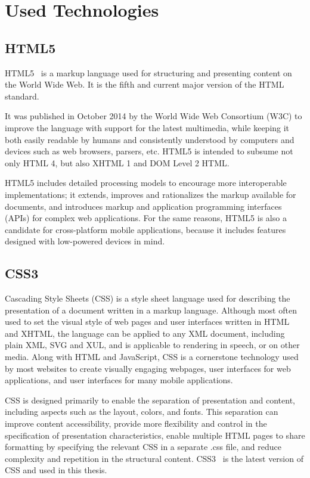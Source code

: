 \section{Used Technologies}

\subsection{HTML5}
HTML5~\cite{pilgrim2010html5} is a markup language used for structuring and presenting content on the World Wide Web. It is the fifth and current major version of the HTML standard.\par
It was published in October 2014 by the World Wide Web Consortium (W3C) to improve the language with support for the latest multimedia, while keeping it both easily readable by humans and consistently understood by computers and devices such as web browsers, parsers, etc. HTML5 is intended to subsume not only HTML 4, but also XHTML 1 and DOM Level 2 HTML.\par
HTML5 includes detailed processing models to encourage more interoperable implementations; it extends, improves and rationalizes the markup available for documents, and introduces markup and application programming interfaces (APIs) for complex web applications. For the same reasons, HTML5 is also a candidate for cross-platform mobile applications, because it includes features designed with low-powered devices in mind.

\subsection{CSS3}
Cascading Style Sheets (CSS) is a style sheet language used for describing the presentation of a document written in a markup language. Although most often used to set the visual style of web pages and user interfaces written in HTML and XHTML, the language can be applied to any XML document, including plain XML, SVG and XUL, and is applicable to rendering in speech, or on other media. Along with HTML and JavaScript, CSS is a cornerstone technology used by most websites to create visually engaging webpages, user interfaces for web applications, and user interfaces for many mobile applications.\par
CSS is designed primarily to enable the separation of presentation and content, including aspects such as the layout, colors, and fonts. This separation can improve content accessibility, provide more flexibility and control in the specification of presentation characteristics, enable multiple HTML pages to share formatting by specifying the relevant CSS in a separate .css file, and reduce complexity and repetition in the structural content. CSS3~\cite{mcfarland2012css3} is the latest version of CSS and used in this thesis.


